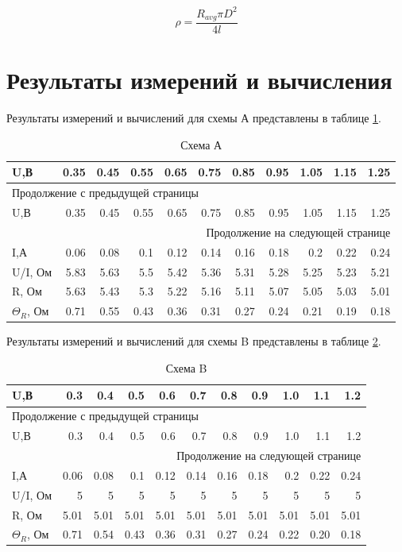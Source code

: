 \documentclass[14pt]{extarticle}
\begin{document}
\begin{equation}
\label{eq:org2646683}
\rho = \frac{R_{avg} \pi D^2}{4l}
\end{equation}
\section{Результаты измерений и вычисления}
\label{sec:org71a1726}

Результаты измерений и вычислений для схемы А представлены в таблице \ref{tab:org82e5dd4}.

\begin{longtable}{|l|r|r|r|r|r|r|r|r|r|r|}
\caption{\label{tab:org82e5dd4}Схема А}
\\
\hline
U,В & 0.35 & 0.45 & 0.55 & 0.65 & 0.75 & 0.85 & 0.95 & 1.05 & 1.15 & 1.25\\
\hline
\endfirsthead
\multicolumn{11}{l}{Продолжение с предыдущей страницы} \\
\hline

U,В & 0.35 & 0.45 & 0.55 & 0.65 & 0.75 & 0.85 & 0.95 & 1.05 & 1.15 & 1.25 \\

\hline
\endhead
\hline\multicolumn{11}{r}{Продолжение на следующей странице} \\
\endfoot
\endlastfoot
\hline
I,А & 0.06 & 0.08 & 0.1 & 0.12 & 0.14 & 0.16 & 0.18 & 0.2 & 0.22 & 0.24\\
\hline
U/I, Ом & 5.83 & 5.63 & 5.5 & 5.42 & 5.36 & 5.31 & 5.28 & 5.25 & 5.23 & 5.21\\
\hline
R, Ом & 5.63 & 5.43 & 5.3 & 5.22 & 5.16 & 5.11 & 5.07 & 5.05 & 5.03 & 5.01\\
\hline
\(\Theta_R\), Ом & 0.71 & 0.55 & 0.43 & 0.36 & 0.31 & 0.27 & 0.24 & 0.21 & 0.19 & 0.18\\
\hline
\end{longtable}

Результаты измерений и вычислений для схемы B представлены в таблице \ref{tab:org987e67d}.


\begin{longtable}{|l|r|r|r|r|r|r|r|r|r|r|}
\caption{\label{tab:org987e67d}Схема B}
\\
\hline
U,В & 0.3 & 0.4 & 0.5 & 0.6 & 0.7 & 0.8 & 0.9 & 1.0 & 1.1 & 1.2\\
\hline
\endfirsthead
\multicolumn{11}{l}{Продолжение с предыдущей страницы} \\
\hline

U,В & 0.3 & 0.4 & 0.5 & 0.6 & 0.7 & 0.8 & 0.9 & 1.0 & 1.1 & 1.2 \\

\hline
\endhead
\hline\multicolumn{11}{r}{Продолжение на следующей странице} \\
\endfoot
\endlastfoot
\hline
I,А & 0.06 & 0.08 & 0.1 & 0.12 & 0.14 & 0.16 & 0.18 & 0.2 & 0.22 & 0.24\\
\hline
U/I, Ом & 5 & 5 & 5 & 5 & 5 & 5 & 5 & 5 & 5 & 5\\
\hline
R, Ом & 5.01 & 5.01 & 5.01 & 5.01 & 5.01 & 5.01 & 5.01 & 5.01 & 5.01 & 5.01\\
\hline
\(\Theta_R\), Ом & 0.71 & 0.54 & 0.43 & 0.36 & 0.31 & 0.27 & 0.24 & 0.22 & 0.20 & 0.18\\
\hline
\end{longtable}
\end{document}
